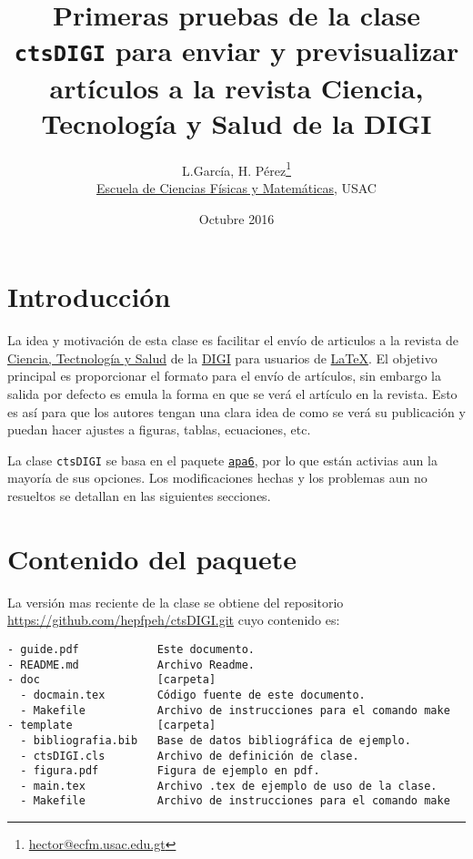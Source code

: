 \documentclass{article}
\title{Primeras pruebas de la clase \texttt{ctsDIGI} para enviar y previsualizar artículos a la revista Ciencia, Tecnología y Salud de la DIGI}
\author{L.García, H. Pérez\footnote{\href{mailto:hector@ecfm.usac.edu.gt}{hector@ecfm.usac.edu.gt}}\\\small{\href{http://ecfm.usac.edu.gt}{Escuela de Ciencias Físicas y Matemáticas}, USAC}}
\date{Octubre 2016}
\begin{document}
\maketitle



\section{Introducción}
La idea y motivación de esta clase es facilitar el envío de articulos a la revista de \href{http://digi.usac.edu.gt/ojsrevistas/index.php/cytes}{Ciencia, Tectnología y Salud} de la \href{http://digi.usac.edu.gt/}{DIGI} para usuarios de \href{https://www.latex-project.org/}{\LaTeX}. 
El objetivo principal es proporcionar el formato para el envío de artículos, sin embargo la salida por defecto es emula la forma en que se verá el artículo en la revista. Esto es así para que los autores tengan una clara idea de como se verá su publicación y puedan hacer ajustes a figuras, tablas, ecuaciones, etc.

La clase \texttt{ctsDIGI} se basa en el paquete \href{https://www.ctan.org/pkg/apa6}{\texttt{apa6}}, por lo que están activias aun la mayoría de sus opciones. Los modificaciones hechas y los problemas aun no resueltos se detallan en las siguientes secciones.

\section{Contenido del paquete}
La versión mas reciente de la clase se obtiene del repositorio \href{https://github.com/hepfpeh/ctsDIGI.git}{https://github.com/hepfpeh/ctsDIGI.git} cuyo contenido es:
\begin{verbatim}
- guide.pdf            Este documento.
- README.md            Archivo Readme.
- doc                  [carpeta]
  - docmain.tex        Código fuente de este documento.
  - Makefile           Archivo de instrucciones para el comando make
- template             [carpeta]
  - bibliografia.bib   Base de datos bibliográfica de ejemplo.
  - ctsDIGI.cls        Archivo de definición de clase.
  - figura.pdf         Figura de ejemplo en pdf.           
  - main.tex           Archivo .tex de ejemplo de uso de la clase.
  - Makefile           Archivo de instrucciones para el comando make
\end{verbatim}
\end{document}
